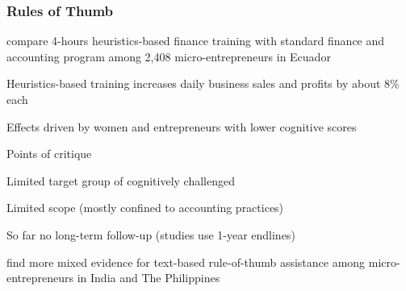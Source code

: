 \documentclass[hideothersubsections, usenames,dvipsnames,11pt]{beamer}
\newenvironment{itemize_2pt}{\itemize\addtolength{\itemsep}{2pt}}{\enditemize}
\begin{document}
\begin{frame}
\frametitle{Rules of Thumb}
	\begin{itemize_2pt}
		\item \citet{Arraiz2019} compare 4-hours heuristics-based finance training with standard finance and accounting program among 2,408 micro-entrepreneurs in Ecuador 
		\begin{itemize_2pt}
			\item Heuristics-based training increases daily business sales and profits by about 8\% each
			\item Effects driven by \textcolor{bdf}{women} and entrepreneurs with \textcolor{bdf}{lower cognitive scores}
		\end{itemize_2pt}
		
		\vspace{1.0em}
		
		\item Points of critique
		\begin{itemize_2pt}
			\item \textcolor{bdf}{Limited target group} of cognitively challenged
			\item \textcolor{bdf}{Limited scope} (mostly confined to accounting practices)
			\item So far \textcolor{bdf}{no long-term follow-up} (studies use 1-year endlines)
			\item \citet{Cole2018} find more mixed evidence for text-based rule-of-thumb assistance among micro-entrepreneurs in India and The Philippines
		\end{itemize_2pt}
		
	\end{itemize_2pt}
\end{frame}

%
\end{document}
